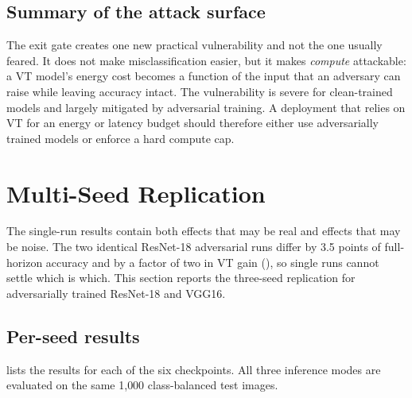 \subsection{Summary of the attack surface}

The exit gate creates one new practical vulnerability and not the one usually feared. It does not make misclassification easier, but it makes \emph{compute} attackable: a VT model's energy cost becomes a function of the input that an adversary can raise while leaving accuracy intact. The vulnerability is severe for clean-trained models and largely mitigated by adversarial training. A deployment that relies on VT for an energy or latency budget should therefore either use adversarially trained models or enforce a hard compute cap.

\section{Multi-Seed Replication}
\label{sec:res-multiseed}

The single-run results contain both effects that may be real and effects that may be noise. The two identical ResNet-18 adversarial runs differ by 3.5 points of full-horizon accuracy and by a factor of two in VT gain (), so single runs cannot settle which is which. This section reports the three-seed replication for adversarially trained ResNet-18 and VGG16.

\subsection{Per-seed results}

 lists the results for each of the six checkpoints. All three inference modes are evaluated on the same 1{,}000 class-balanced test images.

